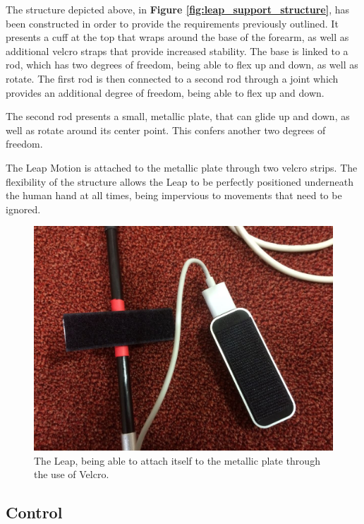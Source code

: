 \documentclass[12p,a4paper]{report}
\begin{document}
The structure depicted above, in \textbf{Figure \ref{fig:leap_support_structure}}, has been constructed in order to provide the requirements previously outlined. It presents a cuff at the top that wraps around the base of the forearm, as well as additional velcro straps that provide increased stability. The base is linked to a rod, which has two degrees of freedom, being able to flex up and down, as well as rotate. The first rod is then connected to a second rod through a joint which provides an additional degree of freedom, being able to flex up and down.

The second rod presents a small, metallic plate, that can glide up and down, as well as rotate around its center point. This confers another two degrees of freedom. 

The Leap Motion is attached to the metallic plate through two velcro strips. The flexibility of the structure allows the Leap to be perfectly positioned underneath the human hand at all times, being impervious to movements that need to be ignored.  

\begin{figure}[H]
\begin{center}
\includegraphics[scale=0.50]{leap_velcro_low}
\caption{The Leap, being able to attach itself to the metallic plate through the use of Velcro.}
\label{fig:leap_velcro}
\end{center}
\end{figure}

\subsection{Control}
\end{document}
